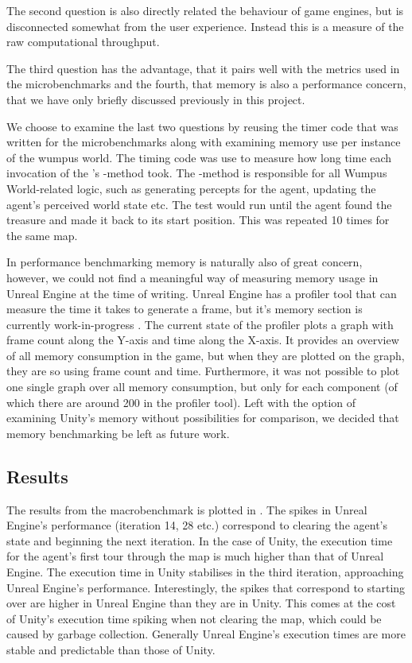 The second question is also directly related the behaviour of game engines, but is disconnected somewhat from the user experience. Instead this is a measure of the raw computational throughput. 

The third question has the advantage, that it pairs well with the metrics used in the microbenchmarks and the fourth, that memory is also a performance concern, that we have only briefly discussed previously in this project.

We choose to examine the last two questions by reusing the timer code that was written for the microbenchmarks along with examining memory use per instance of the wumpus world. The timing code was use to measure how long time each invocation of the 's -method took. The -method is responsible for all Wumpus World-related logic, such as generating percepts for the agent, updating the agent's perceived world state etc. The test would run until the agent found the treasure and made it back to its start position. This was repeated 10 times for the same map. 

In performance benchmarking memory is naturally also of great concern, however, we could not find a meaningful way of measuring memory usage in Unreal Engine at the time of writing. Unreal Engine has a profiler tool that can measure the time it takes to generate a frame, but it's memory section is currently work-in-progress \cite{unreal:profiler}. The current state of the profiler plots a graph with frame count along the Y-axis and time along the X-axis. It provides an overview of all memory consumption in the game, but when they are plotted on the graph, they are so using frame count and time. Furthermore, it was not possible to plot one single graph over all memory consumption, but only for each component (of which there are around 200 in the profiler tool). Left with the option of examining Unity's memory without possibilities for comparison, we decided that memory benchmarking be left as future work.

\subsection{Results}
The results from the macrobenchmark is plotted in . The spikes in Unreal Engine's performance (iteration 14, 28 etc.) correspond to clearing the agent's state and beginning the next iteration. In the case of Unity, the execution time for the agent's first tour through the map is much higher than that of Unreal Engine. The execution time in Unity stabilises in the third iteration, approaching Unreal Engine's performance. Interestingly, the spikes that correspond to starting over are higher in Unreal Engine than they are in Unity. This comes at the cost of Unity's execution time spiking when not clearing the map, which could be caused by garbage collection. Generally Unreal Engine's execution times are more stable and predictable than those of Unity.

